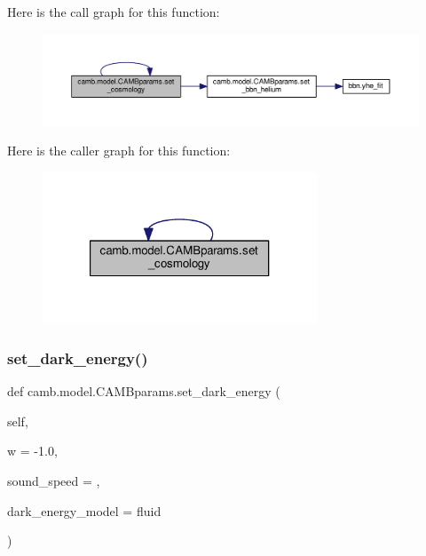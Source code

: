 Here is the call graph for this function\+:
\nopagebreak
\begin{figure}[H]
\begin{center}
\leavevmode
\includegraphics[width=350pt]{classcamb_1_1model_1_1CAMBparams_a2cc8871c90745590e02d61f2c731100c_cgraph}
\end{center}
\end{figure}
Here is the caller graph for this function\+:
\nopagebreak
\begin{figure}[H]
\begin{center}
\leavevmode
\includegraphics[width=232pt]{classcamb_1_1model_1_1CAMBparams_a2cc8871c90745590e02d61f2c731100c_icgraph}
\end{center}
\end{figure}
\mbox{\label{classcamb_1_1model_1_1CAMBparams_a59530c15dc52ae15a94c678dbac52e24}} 
\subsubsection{\texorpdfstring{set\+\_\+dark\+\_\+energy()}{set\_dark\_energy()}}
{\footnotesize\ttfamily def camb.\+model.\+C\+A\+M\+Bparams.\+set\+\_\+dark\+\_\+energy (\begin{DoxyParamCaption}\item[{}]{self,  }\item[{}]{w = {\ttfamily -\/1.0},  }\item[{}]{sound\+\_\+speed = {},  }\item[{}]{dark\+\_\+energy\+\_\+model = {\ttfamily \textquotesingle{}fluid\textquotesingle{}} }\end{DoxyParamCaption})}


